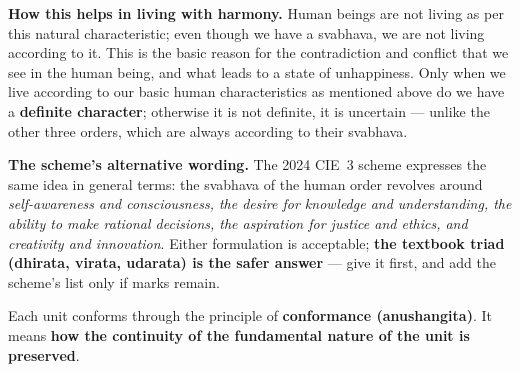 \textbf{How this helps in living with harmony.} Human beings are not living as
per this natural characteristic; even though we have a svabhava, we are not
living according to it. This is the basic reason for the contradiction and
conflict that we see in the human being, and what leads to a state of
unhappiness. Only when we live according to our basic human characteristics as
mentioned above do we have a \textbf{definite character}; otherwise it is not
definite, it is uncertain --- unlike the other three orders, which are always
according to their svabhava.

\begin{note}
\textbf{\sffamily The scheme's alternative wording.} The 2024 CIE~3 scheme
expresses the same idea in general terms: the svabhava of the human order
revolves around \emph{self-awareness and consciousness, the desire for
knowledge and understanding, the ability to make rational decisions, the
aspiration for justice and ethics, and creativity and innovation}. Either
formulation is acceptable; \textbf{the textbook triad (dhirata, virata,
udarata) is the safer answer} --- give it first, and add the scheme's list
only if marks remain.
\end{note}

%
  {}

\ans Each unit conforms through the principle of \textbf{conformance
(anushangita)}. It means \textbf{how the continuity of the fundamental nature
of the unit is preserved}.

